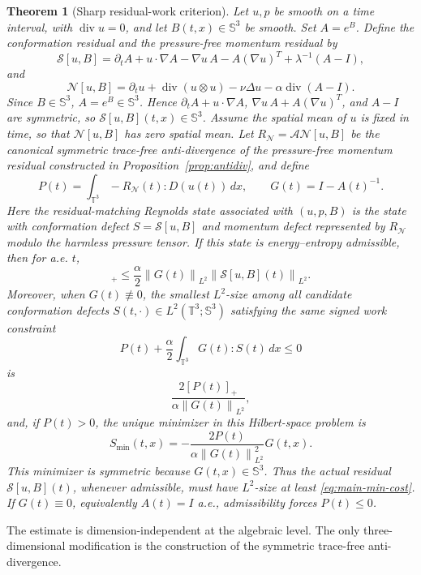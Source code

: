 \documentclass[11pt]{article}
\numberwithin{equation}{section}
\newtheorem{theorem}{Theorem}[section]
\newcommand{\T}{\mathbb T}
\newcommand{\Id}{I}
\newcommand{\Sym}{\mathbb S}
\newcommand{\divv}{\operatorname{div}}
\newcommand{\calN}{\mathcal N}
\newcommand{\calS}{\mathcal S}
\newcommand{\calA}{\mathcal A}
\newcommand{\norm}[1]{\left\lVert #1\right\rVert}
\begin{document}
\begin{theorem}[Sharp residual-work criterion]
\label{thm:residual-main}
Let \(u,p\) be smooth on a time interval, with \(\divv u=0\), and let
\(B(t,x)\in\Sym^3\) be smooth.  Set \(A=e^B\).  Define the conformation
residual and the pressure-free momentum residual by
\[
  \calS[u,B]
  =
  \partial_t A+u\cdot\nabla A-\nabla u\,A-A(\nabla u)^T
  +\lambda^{-1}(A-\Id),
\]
and
\[
  \calN[u,B]
  =
  \partial_t u+\divv(u\otimes u)-\nu\Delta u-\alpha\divv(A-\Id).
\]
Since \(B\in\Sym^3\), \(A=e^B\in\Sym^3\).  Hence
\(\partial_tA+u\cdot\nabla A\), \(\nabla u\,A+A(\nabla u)^T\), and
\(A-\Id\) are symmetric, so \(\calS[u,B](t,x)\in\Sym^3\).
Assume the spatial mean of \(u\) is fixed in time, so that \(\calN[u,B]\) has
zero spatial mean.  Let
\(R_{\calN}=\calA\calN[u,B]\) be the canonical symmetric trace-free
anti-divergence of the pressure-free momentum residual constructed in
Proposition~\ref{prop:antidiv}, and define
\[
  P(t)=\int_{\T^3}-R_{\calN}(t):D(u(t))\,dx,\qquad
  G(t)=\Id-A(t)^{-1}.
\]
Here the residual-matching Reynolds state associated with \((u,p,B)\) is the
state with conformation defect \(S=\calS[u,B]\) and momentum defect represented
by \(R_{\calN}\) modulo the harmless pressure tensor.  If this state is
energy--entropy admissible, then for a.e. \(t\),
\begin{equation}
  [P(t)]_+
  \le
  \frac{\alpha}{2}
  \norm{G(t)}_{L^2}\norm{\calS[u,B](t)}_{L^2}.
  \label{eq:main-residual-cost}
\end{equation}
Moreover, when \(G(t)\not\equiv0\), the smallest \(L^2\)-size among all
candidate conformation defects \(S(t,\cdot)\in L^2(\T^3;\Sym^3)\) satisfying
the same signed work constraint
\[
  P(t)+\frac{\alpha}{2}\int_{\T^3}G(t):S(t)\,dx\le0
\]
is
\begin{equation}
  \frac{2[P(t)]_+}{\alpha\norm{G(t)}_{L^2}},
  \label{eq:main-min-cost}
\end{equation}
and, if \(P(t)>0\), the unique minimizer in this Hilbert-space problem is
\[
  S_{\min}(t,x)
  =
  -\frac{2P(t)}{\alpha\norm{G(t)}_{L^2}^2}G(t,x).
\]
This minimizer is symmetric because \(G(t,x)\in\Sym^3\).
Thus the actual residual \(\calS[u,B](t)\), whenever admissible, must have
\(L^2\)-size at least \eqref{eq:main-min-cost}.
If \(G(t)\equiv0\), equivalently \(A(t)=\Id\) a.e., admissibility forces
\(P(t)\le0\).
\end{theorem}

The estimate is dimension-independent at the algebraic level.  The only
three-dimensional modification is the construction of the symmetric
trace-free anti-divergence.
\end{document}
